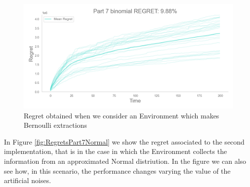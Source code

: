 \begin{figure}
    \includegraphics[width=\textwidth]{images/part7_binomial_regret.png}
    \caption{Regret obtained when we consider an Environment which makes Bernoulli extractions}
    \label{regretPart7Binomial}
\end{figure}

In Figure \ref{fig:RegretsPart7Normal} we show the regret associated to the second implementation, that is in the case in which the Environment collects the information from an approximated Normal distriution. In the figure we can also see how, in this scenario, the performance changes varying the value of the artificial noises.

